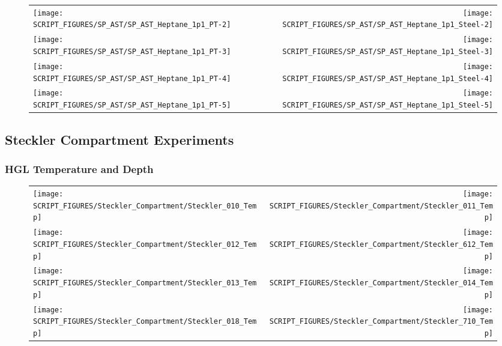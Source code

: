 \begin{figure}[!ht]
\begin{tabular*}{\textwidth}{l@{\extracolsep{\fill}}r}
\texttt{[image: SCRIPT\_FIGURES/SP\_AST/SP\_AST\_Heptane\_1p1\_PT-2]} &  \texttt{[image: SCRIPT\_FIGURES/SP\_AST/SP\_AST\_Heptane\_1p1\_Steel-2]}  \\
\texttt{[image: SCRIPT\_FIGURES/SP\_AST/SP\_AST\_Heptane\_1p1\_PT-3]} &  \texttt{[image: SCRIPT\_FIGURES/SP\_AST/SP\_AST\_Heptane\_1p1\_Steel-3]}  \\
\texttt{[image: SCRIPT\_FIGURES/SP\_AST/SP\_AST\_Heptane\_1p1\_PT-4]} &  \texttt{[image: SCRIPT\_FIGURES/SP\_AST/SP\_AST\_Heptane\_1p1\_Steel-4]}  \\
\texttt{[image: SCRIPT\_FIGURES/SP\_AST/SP\_AST\_Heptane\_1p1\_PT-5]} &  \texttt{[image: SCRIPT\_FIGURES/SP\_AST/SP\_AST\_Heptane\_1p1\_Steel-5]}
\end{tabular*}
\label{SP_Heptane_1p1_PT_Steel}
\end{figure}

\clearpage

\subsection{Steckler Compartment Experiments}

\subsubsection{HGL Temperature and Depth}

\begin{figure}[!ht]
\begin{tabular*}{\textwidth}{l@{\extracolsep{\fill}}r}
\texttt{[image: SCRIPT\_FIGURES/Steckler\_Compartment/Steckler\_010\_Temp]} &
\texttt{[image: SCRIPT\_FIGURES/Steckler\_Compartment/Steckler\_011\_Temp]} \\
\texttt{[image: SCRIPT\_FIGURES/Steckler\_Compartment/Steckler\_012\_Temp]} &
\texttt{[image: SCRIPT\_FIGURES/Steckler\_Compartment/Steckler\_612\_Temp]} \\
\texttt{[image: SCRIPT\_FIGURES/Steckler\_Compartment/Steckler\_013\_Temp]} &
\texttt{[image: SCRIPT\_FIGURES/Steckler\_Compartment/Steckler\_014\_Temp]} \\
\texttt{[image: SCRIPT\_FIGURES/Steckler\_Compartment/Steckler\_018\_Temp]} &
\texttt{[image: SCRIPT\_FIGURES/Steckler\_Compartment/Steckler\_710\_Temp]}
\end{tabular*}
\label{Steckler_Temp_1}
\end{figure}

